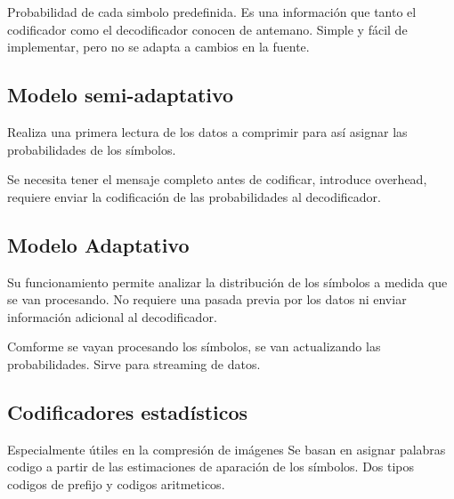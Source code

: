 \documentclass[11pt,a4paper]{article}
\begin{document}
Probabilidad de cada simbolo predefinida. Es una información que tanto el codificador como el decodificador conocen de antemano.
Simple y fácil de implementar, pero no se adapta a cambios en la fuente.

\subsection{Modelo semi-adaptativo}

Realiza una primera lectura de los datos a comprimir para así asignar las probabilidades de los símbolos.

Se necesita tener el mensaje completo antes de codificar, introduce overhead, requiere enviar la codificación de las probabilidades al decodificador.

\subsection{Modelo Adaptativo}
Su funcionamiento permite analizar la distribución de los símbolos a medida que se van procesando. No requiere una pasada previa por los datos ni enviar información adicional al decodificador.

Comforme se vayan procesando los símbolos, se van actualizando las probabilidades. Sirve para streaming de datos.

\subsection{Codificadores estadísticos}
Especialmente útiles en la compresión de imágenes
Se basan en asignar palabras codigo a partir de las estimaciones de aparación de los símbolos. Dos tipos
codigos de prefijo y codigos aritmeticos.
\end{document}
